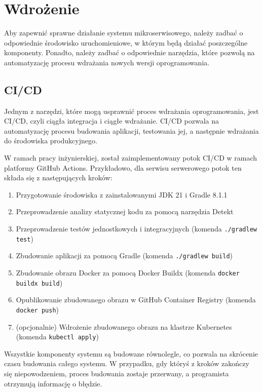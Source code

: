 \clearpage %

\section{Wdrożenie}

Aby zapewnić sprawne działanie systemu mikroserwisowego, należy zadbać o odpowiednie środowisko uruchomieniowe, w którym będą działać poszczególne komponenty. Ponadto, należy zadbać o odpowiednie narzędzia, które pozwolą na automatyzację procesu wdrażania nowych wersji oprogramowania.

\subsection{CI/CD}

Jednym z narzędzi, które mogą usprawnić proces wdrażania oprogramowania, jest CI/CD, czyli ciągła integracja i ciągłe wdrażanie. CI/CD pozwala na automatyzację procesu budowania aplikacji, testowania jej, a następnie wdrażania do środowiska produkcyjnego.

W ramach pracy inżynierskiej, został zaimplementowany potok CI/CD w ramach platformy GitHub Actions. Przykładowo, dla serwisu serwerowego potok ten składa się z następujących kroków:

\begin{enumerate}
    \item Przygotowanie środowiska z zainstalowanymi JDK 21 i Gradle \cite{gradle} 8.1.1
    \item Przeprowadzenie analizy statycznej kodu za pomocą narzędzia Detekt \cite{detekt}
    \item Przeprowadzenie testów jednostkowych i integracyjnych (komenda \texttt{./gradlew test})
    \item Zbudowanie aplikacji za pomocą Gradle (komenda \texttt{./gradlew build})
    \item Zbudowanie obrazu Docker za pomocą Docker Buildx (komenda \texttt{docker buildx build})
    \item Opublikowanie zbudowanego obrazu w GitHub Container Registry \cite{ghcr} (komenda \texttt{docker push})
    \item (opcjonalnie) Wdrożenie zbudowanego obrazu na klastrze Kubernetes (komenda \texttt{kubectl apply})
\end{enumerate}

Wszystkie komponenty systemu są budowane równolegle, co pozwala na skrócenie czasu budowania całego systemu. W przypadku, gdy któryś z kroków zakończy się niepowodzeniem, proces budowania zostaje przerwany, a programista otrzymują informację o błędzie.

